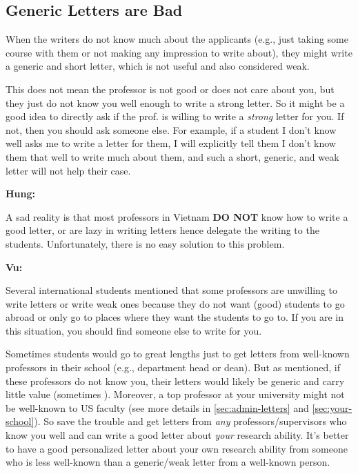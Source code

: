 \documentclass[oneside,11pt,dvipsnames]{book}
\newenvironment{commentbox}[1][]{
  \small
  \begin{mybox}
    {\small \textbf{#1}}
  }{
  \end{mybox}
}
\newcommand{\red}[1]{{\color{red}{#1}}}
\begin{document}
\subsection{Generic Letters are Bad} When the writers do not know much about the applicants (e.g., just taking some course with them or not making any impression to write about), they might write a generic and short letter, which is not useful and also considered weak. 

This does not mean the professor is not good or does not care about you, but they just do not know you well enough to write a strong letter.
So it might be a good idea to directly ask if the prof. is willing to write a \emph{strong} letter for you. If not, then you should ask someone else.  For example, if a student I don't know well asks me to write a letter for them, I will explicitly tell them I don't know them that well to write much about them, and such a short, generic, and weak letter will not help their case.


\begin{commentbox}[Hung:]
  A sad reality is that most professors in Vietnam \textbf{DO NOT} know how to write a good letter, or are lazy in writing letters hence delegate the writing to the students. Unfortunately, there is no easy solution to this problem.
\end{commentbox}

\begin{commentbox}[Vu:]

  Several international students mentioned that some professors are unwilling to write letters or write weak ones because they do not want (good) students to go abroad or only go to places where they want the students to go to. If you are in this situation, you should find someone else to write for you.
  \tcblower

Sometimes students would go to great lengths just to get letters from well-known professors in their school (e.g., department head or dean). But as mentioned, if these professors do not know you, their letters would likely be generic and carry little value (sometimes \red{red flags}). Moreover, a top professor at your university might not be well-known to US faculty (see more details in \autoref{sec:admin-letters} and \autoref{sec:your-school}). So save the trouble and get letters from \emph{any} professors/supervisors who know you well and can write a good letter about \emph{your} research ability. It's better to have a good personalized letter about your own research ability from someone who is less well-known than a generic/weak letter from a well-known person.

\end{commentbox}
\end{document}

